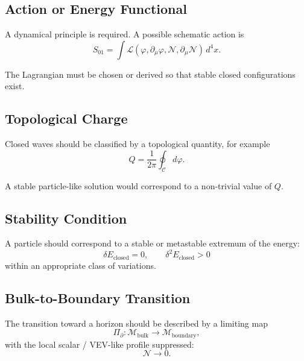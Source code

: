 \documentclass[11pt,a4paper]{article}
\newcommand{\phase}{\varphi}
\newcommand{\normal}{\mathcal{N}}
\newcommand{\memory}{\mathcal{M}}
\newcommand{\contour}{\mathcal{C}}
\begin{document}
\subsection*{Action or Energy Functional}

A dynamical principle is required. A possible schematic action is
\begin{equation}
S_{01} = \int \mathcal{L}(\phase, \partial_\mu \phase, \normal, \partial_\mu \normal)\, d^4x.
\end{equation}

The Lagrangian must be chosen or derived so that stable closed configurations exist.

\subsection*{Topological Charge}

Closed waves should be classified by a topological quantity, for example
\begin{equation}
Q = \frac{1}{2\pi}\oint_{\contour} d\phase.
\end{equation}

A stable particle-like solution would correspond to a non-trivial value of $Q$.

\subsection*{Stability Condition}

A particle should correspond to a stable or metastable extremum of the energy:
\begin{equation}
\delta E_{\mathrm{closed}} = 0, \qquad \delta^2 E_{\mathrm{closed}} > 0
\end{equation}
within an appropriate class of variations.

\subsection*{Bulk-to-Boundary Transition}

The transition toward a horizon should be described by a limiting map
\begin{equation}
\Pi_{\partial}: \memory_{\mathrm{bulk}} \rightarrow \memory_{\mathrm{boundary}},
\end{equation}
with the local scalar / VEV-like profile suppressed:
\begin{equation}
\normal \rightarrow 0.
\end{equation}
\end{document}
